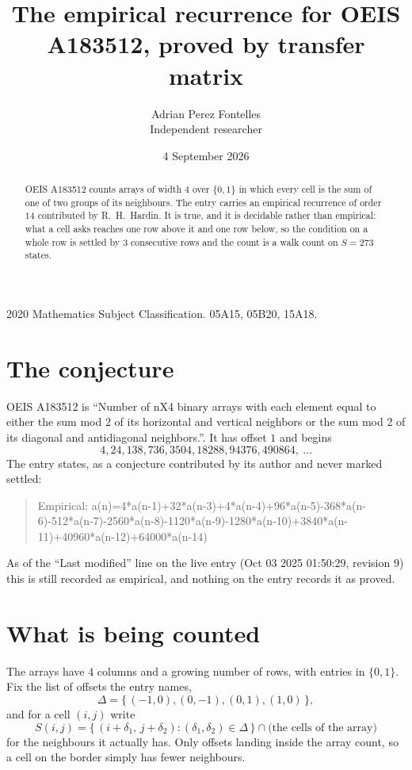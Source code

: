 \documentclass[11pt,a4paper]{article}
\title{The empirical recurrence for OEIS A183512, proved by transfer matrix}
\author{Adrian Perez Fontelles\\ \small Independent researcher}
\date{4 September 2026}
\theoremstyle{plain}
\theoremstyle{definition}
\begin{document}
\maketitle

\begin{abstract}
OEIS A183512 counts arrays of width $4$ over $\{0,1\}$ in which every cell is the sum of one of two groups of its neighbours. The entry carries an
empirical recurrence of order $14$ contributed by R.~H.~Hardin. It is true, and it is
decidable rather than empirical: what a cell asks reaches one row above
it and one row below, so the condition on a whole row is settled by
$3$ consecutive rows and the count is a walk count on $S=273$ states.
\end{abstract}

\noindent\small 2020 Mathematics Subject Classification. 05A15, 05B20, 15A18.\normalsize

\section{The conjecture}

OEIS A183512 is ``Number of nX4 binary arrays with each element equal to either the sum mod 2 of its horizontal and vertical neighbors or the sum mod 2 of its diagonal and antidiagonal neighbors.''. It has offset $1$ and begins
\[
4, 24, 138, 736, 3504, 18288, 94376, 490864,\ \dots
\]
The entry states, as a conjecture contributed by its author and never marked settled:
\begin{quote}
Empirical: a(n)=4*a(n-1)+32*a(n-3)+4*a(n-4)+96*a(n-5)-368*a(n-6)-512*a(n-7)-2560*a(n-8)-1120*a(n-9)-1280*a(n-10)+3840*a(n-11)+40960*a(n-12)+64000*a(n-14)
\end{quote}
As of the ``Last modified'' line on the live entry (Oct 03 2025 01:50:29, revision 9) this is still
recorded as empirical, and nothing on the entry records it as proved.

\section{What is being counted}

The arrays have $4$ columns and a growing number of rows, with entries in $\{0,1\}$. Fix the
list of offsets the entry names,
\[
\Delta=\{\,(-1,0), (0,-1), (0,1), (1,0)\,\},
\]
and for a cell $(i,j)$ write
\[
S(i,j)=\{\,(i+\delta_1,\,j+\delta_2) : (\delta_1,\delta_2)\in\Delta\,\}\cap
\text{(the cells of the array)}
\]
for the neighbours it actually has. Only offsets landing inside the array count, so a cell on
the border simply has fewer neighbours.
\end{document}
